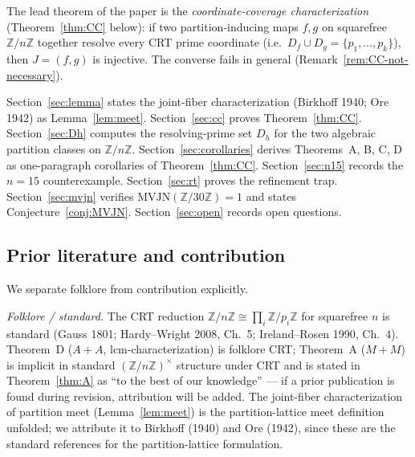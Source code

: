 \documentclass[11pt,reqno]{amsart}
\theoremstyle{plain}
\theoremstyle{definition}
\newcommand{\Z}{\mathbb{Z}}
\newcommand{\Zn}{\Z/n\Z}
\newcommand{\lcm}{\mathrm{lcm}}
\begin{document}
The lead theorem of the paper is the
\emph{coordinate-coverage characterization}
(Theorem~\ref{thm:CC} below): if two partition-inducing maps $f, g$
on squarefree $\Zn$ together resolve every CRT prime coordinate
(i.e.\ $D_f \cup D_g = \{p_1, \ldots, p_k\}$), then $J = (f, g)$ is
injective. The converse fails in general (Remark~\ref{rem:CC-not-necessary}).

Section~\ref{sec:lemma} states the joint-fiber characterization
(Birkhoff 1940; Ore 1942) as Lemma~\ref{lem:meet}.
Section~\ref{sec:cc} proves Theorem~\ref{thm:CC}.
Section~\ref{sec:Dh} computes the resolving-prime set $D_h$ for the
two algebraic partition classes on $\Zn$.
Section~\ref{sec:corollaries} derives Theorems~A, B, C, D as
one-paragraph corollaries of Theorem~\ref{thm:CC}.
Section~\ref{sec:n15} records the $n = 15$ counterexample.
Section~\ref{sec:rt} proves the refinement trap.
Section~\ref{sec:mvjn} verifies $\mathrm{MVJN}(\Z/30\Z) = 1$ and
states Conjecture~\ref{conj:MVJN}.
Section~\ref{sec:open} records open questions.

\subsection{Prior literature and contribution} \label{ssec:prior}

We separate folklore from contribution explicitly.

\emph{Folklore / standard.} The CRT reduction
$\Zn \cong \prod_i \Z/p_i\Z$ for squarefree $n$ is standard
(Gauss 1801; Hardy--Wright 2008, Ch.~5; Ireland--Rosen 1990, Ch.~4).
Theorem~D ($A{+}A$, $\lcm$-characterization) is folklore CRT;
Theorem~A ($M{+}M$) is implicit in standard
$(\Z/n\Z)^{\times}$ structure under CRT and is stated in
Theorem~\ref{thm:A} as ``to the best of our knowledge'' — if a prior
publication is found during revision, attribution will be added. The
joint-fiber characterization of partition meet
(Lemma~\ref{lem:meet}) is the partition-lattice meet definition
unfolded; we attribute it to Birkhoff (1940) and Ore (1942), since
these are the standard references for the partition-lattice
formulation.
\end{document}
